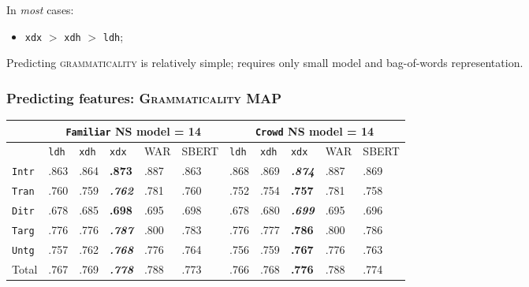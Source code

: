 \documentclass[xcolor={dvipsnames}]{beamer}
\newcommand{\feat}[1]{\textsc{#1}}
\newcommand{\param}[1]{\texttt{#1}}
\begin{document}
\begin{frame}
\pause
In \textit{most} cases:
\begin{itemize}
\pause
\item \param{xdx} $>$ \param{xdh} $>$ \param{ldh};
\end{itemize}

\vspace{1em}

\pause
Predicting \feat{grammaticality} is relatively simple; requires only small model and bag-of-words representation.

\end{frame}

\begin{frame}
\frametitle{Predicting features: \feat{Grammaticality} MAP}

\small

\begin{table}[htb!]
\begin{center}
\setlength{\tabcolsep}{.35em}
\begin{tabular}{|l||l|l|l||l|l||l|l|l||l|l|}
\hline
 & \multicolumn{5}{c||}{\param{Fam\-il\-iar} NS model = 14} & \multicolumn{5}{c|}{\param{Crowd} NS model = 14} \\
\hline
    		& \param{ldh}	& \param{xdh} &	\param{xdx} & WAR	& {\scriptsize SBERT} & \param{ldh}	& \param{xdh} &	\param{xdx} & WAR	& {\scriptsize SBERT} \\ \hline
\hline
\param{Intr}  & .863 & .864 & \textbf{.873}          & .887 & .863 & .868 & .869 & \textit{\textbf{.874}} & .887 & .869 \\ \hline
\param{Tran}  & .760 & .759 & \textit{\textbf{.762}} & .781 & .760 & .752 & .754 & \textbf{.757}          & .781 & .758 \\ \hline
\param{Ditr}  & .678 & .685 & \textbf{.698}          & .695 & .698 & .678 & .680 & \textit{\textbf{.699}} & .695 & .696 \\ \hline
\hline
\param{Targ}  & .776 & .776 & \textit{\textbf{.787}} & .800 & .783 & .776 & .777 & \textbf{.786}          & .800 & .786 \\ \hline
\param{Untg}  & .757 & .762 & \textit{\textbf{.768}} & .776 & .764 & .756 & .759 & \textbf{.767}          & .776 & .763 \\ \hline
\hline
Total & .767 & .769 & \textit{\textbf{.778}} & .788 & .773 & .766 & .768 & \textbf{.776}          & .788 & .774 \\ \hline
\end{tabular}


\end{center}
\end{table}
\end{frame}
\end{document}
